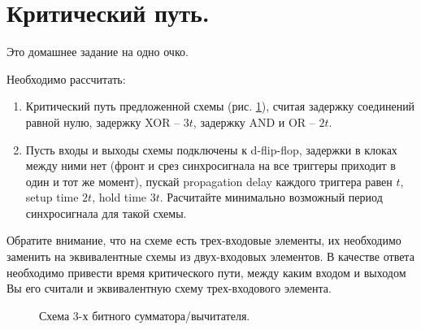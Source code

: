 \documentclass[12pt]{report}
\begin{document}
\section*{\centering \Large Критический путь.}
\indent \indent
Это домашнее задание на одно очко.

Необходимо рассчитать:
\begin{enumerate}
\item
	Критический путь предложенной схемы (рис. \ref{scheme}), считая задержку соединений равной нулю, задержку XOR -- $3t$, задержку AND и OR -- $2t$.
\item
	Пусть входы и выходы схемы подключены к d-flip-flop, задержки в клоках между ними нет (фронт и срез синхросигнала на все триггеры приходит в один и тот же момент), пускай propagation delay каждого триггера равен $t$, setup time $2t$, hold time $3t$. Расчитайте минимально возможный период синхросигнала для такой схемы.
\end{enumerate} 
Обратите внимание, что на схеме есть трех-входовые элементы, их необходимо заменить на эквивалентные схемы из двух-входовых элементов.
В качестве ответа необходимо привести время критического пути, между каким входом и выходом Вы его считали и эквивалентную схему трех-входового элемента.

\begin{figure}[h]
\caption{Схема 3-х битного сумматора/вычитателя.}
\label{scheme}
\end{figure}
\end{document}
